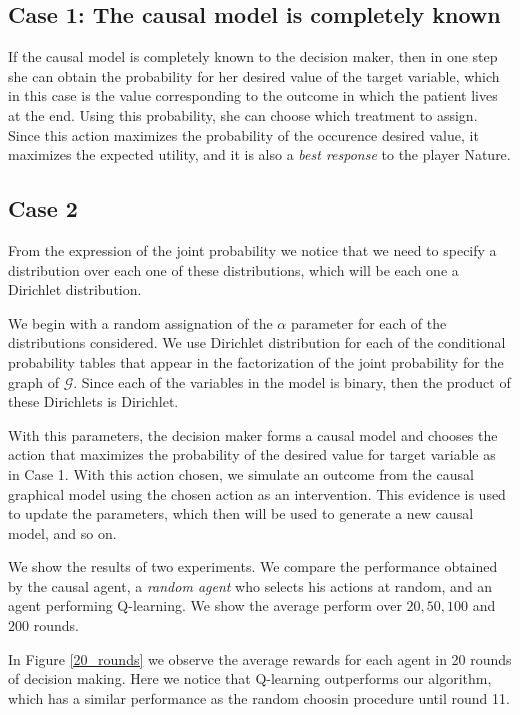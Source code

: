 \documentclass{article}
\begin{document}
\subsection{Case 1: The causal model is completely known}
If the causal model is completely known to the decision maker, then in one step she can obtain the probability for her desired value of the target variable, which in this case is the value corresponding to the outcome in which the patient lives at the end. Using this probability, she can choose which treatment to assign. Since this action maximizes the probability of the occurence desired value, it maximizes the expected utility, and it is also a \textit{best response} to the player Nature.

\subsection{Case 2}
From the expression of the joint probability we notice that we need to specify a distribution over each one of these distributions, which will be each one a Dirichlet distribution.

We begin with a random assignation of the $\alpha$ parameter for each of the distributions considered. We use Dirichlet distribution for each of the conditional probability tables that appear in the factorization of the joint probability for the graph of $\mathcal{G}$. Since each of the variables in the model is binary, then the product of these Dirichlets is Dirichlet.

With this parameters, the decision maker forms a causal model and chooses the action that maximizes the probability of the desired value for target variable as in Case 1.  With this action chosen, we simulate an outcome from the causal graphical model using the chosen action as an intervention. This evidence is used to update the parameters, which then will be used to generate a new causal model, and so on.

We show the results of two experiments. We compare the performance obtained by the causal agent, a \textit{random agent} who selects his actions at random, and an agent performing Q-learning. We show the average perform over $20, 50, 100$ and $200$ rounds.

In Figure \ref{20_rounds} we observe the average rewards for each agent in 20 rounds of decision making. Here we notice that Q-learning outperforms our algorithm, which has a similar performance as the random choosin procedure until round 11.
\end{document}
